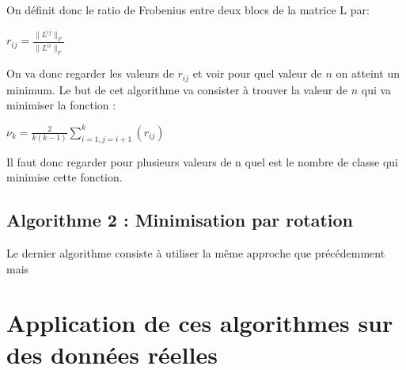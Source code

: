 On définit donc le ratio de Frobenius entre deux blocs de la matrice L par:

\medskip

$
r_{ij} = \frac{ \|{L^{ij}}\|_F }{\| L^{ii} \|_F}
$

\medskip

On va donc regarder les valeurs de $r_{ij}$ et voir pour quel valeur de $n$ on atteint un minimum. Le but de cet algorithme va consister à trouver la valeur de $n$ qui va minimiser la fonction :

\medskip

$
\nu_k = \frac{2}{k(k-1)}\sum_{i=1 , j=i+1}^{k}(r_{ij})
$

\medskip

Il faut donc regarder pour plusieurs valeurs de n quel est le nombre de classe qui minimise cette fonction.

\section{Algorithme 2 : Minimisation par rotation}

Le dernier algorithme consiste à utiliser la même approche que précédemment mais 

\chapter{Application de ces algorithmes sur des données réelles}